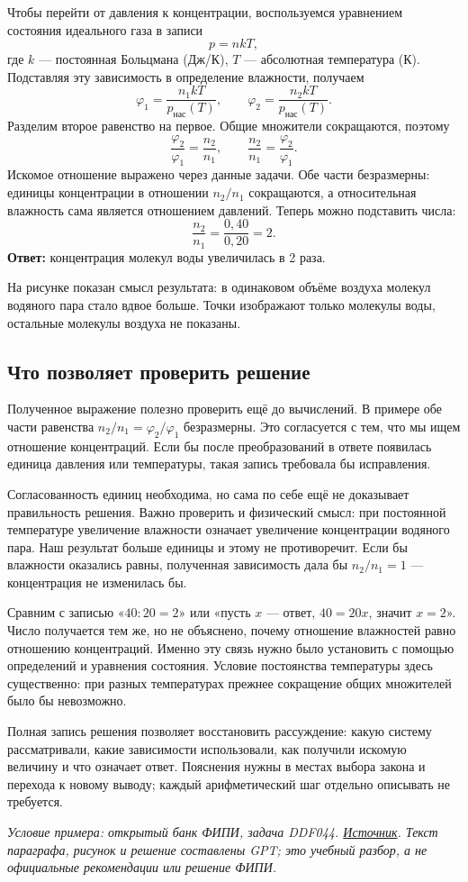 Чтобы перейти от давления к концентрации, воспользуемся уравнением
состояния идеального газа в записи
\[
p=nkT,
\]
где $k$ — постоянная Больцмана (Дж/К), $T$ — абсолютная температура (К).
Подставляя эту зависимость в определение влажности, получаем
\[
\varphi_1=\frac{n_1kT}{p_{\text{нас}}(T)},
\qquad
\varphi_2=\frac{n_2kT}{p_{\text{нас}}(T)}.
\]
Разделим второе равенство на первое. Общие множители сокращаются,
поэтому
\[
\frac{\varphi_2}{\varphi_1}=\frac{n_2}{n_1},
\qquad
\frac{n_2}{n_1}=\frac{\varphi_2}{\varphi_1}.
\]
Искомое отношение выражено через данные задачи. Обе части безразмерны:
единицы концентрации в отношении $n_2/n_1$ сокращаются, а относительная
влажность сама является отношением давлений. Теперь можно подставить числа:
\[
\frac{n_2}{n_1}=\frac{0{,}40}{0{,}20}=2.
\]
\noindent\textbf{Ответ:} концентрация молекул воды увеличилась в 2 раза.

На рисунке показан смысл результата: в одинаковом объёме воздуха
молекул водяного пара стало вдвое больше. Точки изображают только
молекулы воды, остальные молекулы воздуха не показаны.



\newpage
\subsection{Что позволяет проверить решение}

Полученное выражение полезно проверить ещё до вычислений.
В примере обе части равенства $n_2/n_1=\varphi_2/\varphi_1$
безразмерны. Это согласуется с тем, что мы ищем отношение концентраций.
Если бы после преобразований в ответе появилась единица давления
или температуры, такая запись требовала бы исправления.

Согласованность единиц необходима, но сама по себе ещё не доказывает
правильность решения. Важно проверить и физический смысл:
при постоянной температуре увеличение влажности означает увеличение
концентрации водяного пара. Наш результат больше единицы и этому
не противоречит. Если бы влажности оказались равны, полученная
зависимость дала бы $n_2/n_1=1$ — концентрация не изменилась бы.

Сравним с записью «$40:20=2$» или «пусть $x$ — ответ,
$40=20x$, значит $x=2$». Число получается тем же, но не объяснено,
почему отношение влажностей равно отношению концентраций.
Именно эту связь нужно было установить с помощью определений
и уравнения состояния. Условие постоянства температуры здесь
существенно: при разных температурах прежнее сокращение общих
множителей было бы невозможно.

Полная запись решения позволяет восстановить рассуждение:
какую систему рассматривали, какие зависимости использовали,
как получили искомую величину и что означает ответ. Пояснения
нужны в местах выбора закона и перехода к новому выводу;
каждый арифметический шаг отдельно описывать не требуется.

\medskip
{\small\itshape Условие примера: открытый банк ФИПИ, задача DDF044.
\href{https://ege.fipi.ru/bank/questions.php?search=1\&proj=BA1F39653304A5B041B656915DC36B38\&qid=DDF044}{Источник}.
Текст параграфа, рисунок и решение составлены GPT; это учебный разбор,
а не официальные рекомендации или решение ФИПИ.}
